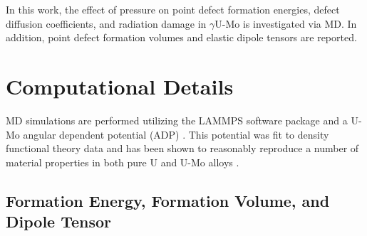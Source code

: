 \documentclass[review]{elsarticle}
\begin{document}
In this work, the effect of pressure on point defect formation energies, defect diffusion coefficients, and radiation damage in $\gamma$U-Mo is investigated via MD. In addition, point defect formation volumes and elastic dipole tensors are reported.

\section{Computational Details}\label{sec2}

MD simulations are performed utilizing the LAMMPS \cite{plimpton1995} software package and a U-Mo angular dependent potential (ADP) \cite{starikov2018,beelerumoxe}. This potential was fit to density functional theory data and has been shown to reasonably reproduce a number of material properties in both pure U and U-Mo alloys \cite{starikov2018,park2023,wang2023,mahbuba2025,hasan2024}.

\subsection{Formation Energy, Formation Volume, and Dipole Tensor}
\end{document}
